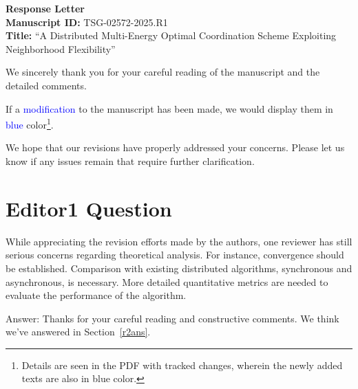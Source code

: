 \documentclass[11pt]{article}
\newcommand{\blue}[1]{\textcolor{blue}{#1}}
\begin{document}
\begin{center}
    {\Large \textbf{Response Letter}}\\[1ex]
    \textbf{Manuscript ID:} TSG-02572-2025.R1\\
    \textbf{Title:} ``A Distributed Multi-Energy Optimal Coordination Scheme Exploiting Neighborhood Flexibility''
\end{center}

We sincerely thank you for your careful reading of the manuscript and the detailed comments.
\par
If a \blue{modification} to the manuscript has been made, we would display them in \blue{blue} color\footnote{Details are seen in the PDF with tracked changes, wherein the newly added texts are also in blue color.}.
\par
We hope that our revisions have properly addressed your concerns.
Please let us know if any issues remain that require further clarification.

\section{Editor1 Question}
\textsf{While appreciating the revision efforts made by the authors, one reviewer has still serious concerns regarding theoretical analysis. For instance, convergence should be established. Comparison with existing distributed algorithms, synchronous and asynchronous, is necessary. More detailed quantitative metrics are needed to evaluate the performance of the algorithm.}
\par
Answer: Thanks for your careful reading and constructive comments. We think we've answered in Section~\ref{r2ans}.
\end{document}
